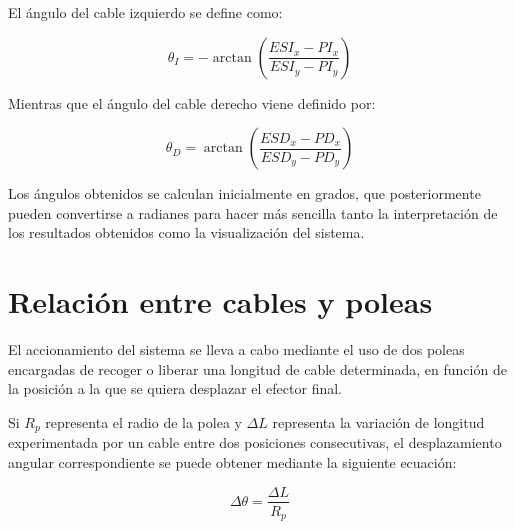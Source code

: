 El ángulo del cable izquierdo se define como:

\begin{myequation}[h]
\begin{equation}
\theta_I = -\arctan \left(\frac{ESI_x - PI_x}{ESI_y - PI_y}\right)
\end{equation}
\caption[Ángulo que forma el cable izquierdo con la vertical.]{Ángulo que forma el cable izquierdo con la vertical.}
\end{myequation}

\newpage

Mientras que el ángulo del cable derecho viene definido por:

\begin{myequation}[h]
\begin{equation}
\theta_D = \arctan \left(\frac{ESD_x - PD_x}{ESD_y - PD_y}\right)
\end{equation}
\caption[Ángulo que forma el cable derecho con la vertical.]{Ángulo que forma el cable derecho con la vertical.}
\end{myequation}

Los ángulos obtenidos se calculan inicialmente en grados, que posteriormente pueden convertirse a radianes para hacer más sencilla tanto la interpretación de los resultados obtenidos como la visualización del sistema.

\section{Relación entre cables y poleas}
\label{sec:segundaseccion}

El accionamiento del sistema se lleva a cabo mediante el uso de dos poleas encargadas de recoger o liberar una longitud de cable determinada, en función de la posición a la que se quiera desplazar el efector final.

\vspace{0.25cm}

Si $R_p$ representa el radio de la polea y $\Delta L$ representa la variación de longitud experimentada por un cable entre dos posiciones consecutivas, el desplazamiento angular correspondiente se puede obtener mediante la siguiente ecuación:

\begin{myequation}[h]
\begin{equation}
\Delta\theta = \frac{\Delta L}{R_p}
\end{equation}
\caption[Relación longitud cable - radio polea.]{Relación longitud cable - radio polea.}
\end{myequation}

